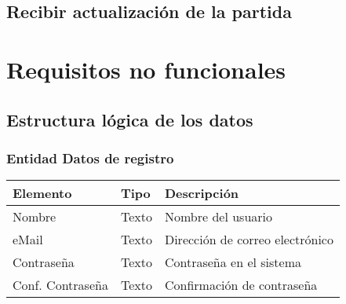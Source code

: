 \subsection{Recibir actualización de la partida}

\section{Requisitos no funcionales}

\subsection{Estructura lógica de los datos}

\subsubsection{Entidad Datos de registro}
\begin{tabularx}{0.9\textwidth}{llX}
\hline
\textbf{Elemento} & \textbf{Tipo} & \textbf{Descripción} \\
\hline
Nombre & Texto & Nombre del usuario \\
eMail & Texto & Dirección de correo electrónico \\
Contraseña & Texto & Contraseña en el sistema \\
Conf. Contraseña & Texto & Confirmación de contraseña \\
\hline
\end{tabularx}
